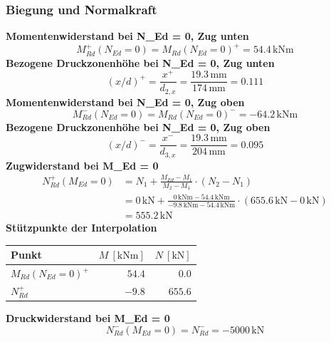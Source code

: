 \documentclass[11pt,a4paper]{article}
\begin{document}
\subsubsection{Biegung und Normalkraft}
\noindent\textbf{Momentenwiderstand bei N\_Ed = 0, Zug unten}
\begin{equation*}
M_{Rd}^{+}(N_{Ed} = 0) = M_{Rd}(N_{Ed}=0)^{+} = 54.4\,\mathrm{kNm}
\end{equation*}
\noindent\textbf{Bezogene Druckzonenhöhe bei N\_Ed = 0, Zug unten}
\begin{equation*}
\left(x/d\right)^{+} = \frac{x^{+}}{d_{2,x}} = \frac{19.3\,\mathrm{mm}}{174\,\mathrm{mm}} = 0.111
\end{equation*}
\noindent\textbf{Momentenwiderstand bei N\_Ed = 0, Zug oben}
\begin{equation*}
M_{Rd}^{-}(N_{Ed} = 0) = M_{Rd}(N_{Ed}=0)^{-} = -64.2\,\mathrm{kNm}
\end{equation*}
\noindent\textbf{Bezogene Druckzonenhöhe bei N\_Ed = 0, Zug oben}
\begin{equation*}
\left(x/d\right)^{-} = \frac{x^{-}}{d_{3,x}} = \frac{19.3\,\mathrm{mm}}{204\,\mathrm{mm}} = 0.095
\end{equation*}
\noindent\textbf{Zugwiderstand bei M\_Ed = 0}
\begin{equation*}
\begin{aligned}
  N_{Rd}^{+}(M_{Ed} = 0) &= N_1 + \frac{M_{Ed} - M_1}{M_2 - M_1} \cdot \left(N_2 - N_1\right) \\
  &= 0\,\mathrm{kN} + \frac{0\,\mathrm{kNm} - 54.4\,\mathrm{kNm}}{-9.8\,\mathrm{kNm} - 54.4\,\mathrm{kNm}} \cdot \left(655.6\,\mathrm{kN} - 0\,\mathrm{kN}\right) \\
  &= 555.2\,\mathrm{kN}
\end{aligned}
\end{equation*}
\noindent\textbf{Stützpunkte der Interpolation}
\begin{longtable}{lrr}
\hline
Punkt & $M\ [\mathrm{kNm}]$ & $N\ [\mathrm{kN}]$ \\
\hline
\endhead
$M_{Rd}(N_{Ed}=0)^{+}$ & $54.4$ & $0.0$ \\
$N_{Rd}^{+}$ & $-9.8$ & $655.6$ \\
\hline
\end{longtable}
\noindent\textbf{Druckwiderstand bei M\_Ed = 0}
\begin{equation*}
N_{Rd}^{-}(M_{Ed} = 0) = N_{Rd}^{-} = -5000\,\mathrm{kN}
\end{equation*}
\end{document}
